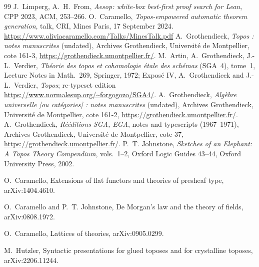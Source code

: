 \begin{thebibliography}{99}
 J.~Limperg, A.~H.~From, \emph{Aesop: white-box best-first proof search for Lean}, CPP 2023, ACM, 253--266.
 O.~Caramello, \emph{Topos-empowered automatic theorem generation}, talk, CRI, Mines Paris, 17 September 2024. \url{https://www.oliviacaramello.com/Talks/MinesTalk.pdf}
 A.~Grothendieck, \emph{Topos : notes manuscrites} (undated), Archives Grothendieck, Université de Montpellier, cote 161-3, \url{https://grothendieck.umontpellier.fr/}.
 M.~Artin, A.~Grothendieck, J.-L.~Verdier, \emph{Théorie des topos et cohomologie étale des schémas} (SGA~4), tome~1, Lecture Notes in Math.~269, Springer, 1972; Exposé IV, A.~Grothendieck and J.-L.~Verdier, \emph{Topos}; re-typeset edition \url{https://www.normalesup.org/~forgogozo/SGA4/}.
 A.~Grothendieck, \emph{Algèbre universelle [ou catégories] : notes manuscrites} (undated), Archives Grothendieck, Université de Montpellier, cote 161-2, \url{https://grothendieck.umontpellier.fr/}.
 A.~Grothendieck, \emph{Rééditions SGA, EGA}, notes and typescripts (1967--1971), Archives Grothendieck, Université de Montpellier, cote 37, \url{https://grothendieck.umontpellier.fr/}.
 P.~T. Johnstone, \emph{Sketches of an Elephant: A Topos Theory Compendium}, vols.~1--2, Oxford Logic Guides 43--44, Oxford University Press, 2002.

 O.~Caramello, Extensions of flat functors and theories of presheaf type, arXiv:1404.4610.

 O.~Caramello and P.~T. Johnstone, De Morgan's law and the theory of fields, arXiv:0808.1972.

 O.~Caramello, Lattices of theories, arXiv:0905.0299.

 M.~Hutzler, Syntactic presentations for glued toposes and for crystalline toposes, arXiv:2206.11244.


\end{thebibliography}
